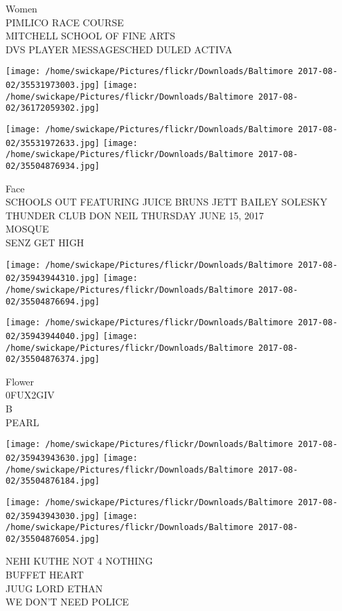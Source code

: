 \documentclass[10pt,letterpaper]{article}
\begin{document}
Women\\
PIMLICO RACE COURSE\\
MITCHELL SCHOOL OF FINE ARTS\\
DVS PLAYER MESSAGESCHED DULED ACTIVA\\
\pagebreak

\texttt{[image: /home/swickape/Pictures/flickr/Downloads/Baltimore 2017-08-02/35531973003.jpg]}
\texttt{[image: /home/swickape/Pictures/flickr/Downloads/Baltimore 2017-08-02/36172059302.jpg]}

\texttt{[image: /home/swickape/Pictures/flickr/Downloads/Baltimore 2017-08-02/35531972633.jpg]}
\texttt{[image: /home/swickape/Pictures/flickr/Downloads/Baltimore 2017-08-02/35504876934.jpg]}

Face\\
SCHOOLS OUT FEATURING JUICE BRUNS JETT BAILEY SOLESKY THUNDER CLUB DON NEIL THURSDAY JUNE 15, 2017\\
MOSQUE\\
SENZ GET HIGH\\
\pagebreak

\texttt{[image: /home/swickape/Pictures/flickr/Downloads/Baltimore 2017-08-02/35943944310.jpg]}
\texttt{[image: /home/swickape/Pictures/flickr/Downloads/Baltimore 2017-08-02/35504876694.jpg]}

\texttt{[image: /home/swickape/Pictures/flickr/Downloads/Baltimore 2017-08-02/35943944040.jpg]}
\texttt{[image: /home/swickape/Pictures/flickr/Downloads/Baltimore 2017-08-02/35504876374.jpg]}

Flower\\
0FUX2GIV\\
B\\
PEARL\\
\pagebreak

\texttt{[image: /home/swickape/Pictures/flickr/Downloads/Baltimore 2017-08-02/35943943630.jpg]}
\texttt{[image: /home/swickape/Pictures/flickr/Downloads/Baltimore 2017-08-02/35504876184.jpg]}

\texttt{[image: /home/swickape/Pictures/flickr/Downloads/Baltimore 2017-08-02/35943943030.jpg]}
\texttt{[image: /home/swickape/Pictures/flickr/Downloads/Baltimore 2017-08-02/35504876054.jpg]}

NEHI KUTHE NOT 4 NOTHING\\
BUFFET HEART\\
JUUG LORD ETHAN\\
WE DON'T NEED POLICE\\
\pagebreak
\end{document}
